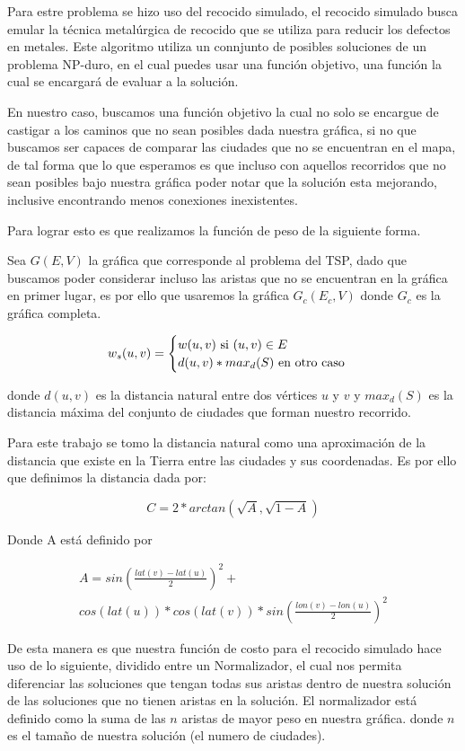 \begin{multicols}{2}
Para estre problema se hizo uso del recocido simulado, el recocido simulado busca emular la técnica metalúrgica de recocido que se utiliza para reducir los defectos en metales. Este algoritmo utiliza un connjunto de posibles soluciones de un problema NP-duro, en el cual puedes usar una función objetivo, una función la cual se encargará de evaluar a la solución.

En nuestro caso, buscamos una función objetivo la cual no solo se encargue de castigar a los caminos que no sean posibles dada nuestra gráfica, si no que buscamos ser capaces de comparar las ciudades que no se encuentran en el mapa, de tal forma que lo que esperamos es que incluso con aquellos recorridos que no sean posibles bajo nuestra gráfica poder notar que la solución esta mejorando, inclusive encontrando menos conexiones inexistentes.

Para lograr esto es que realizamos la función de peso de la siguiente forma.

Sea $G(E,V)$ la gráfica que corresponde al problema del TSP, dado que buscamos poder considerar incluso las aristas que no se encuentran en la gráfica en primer lugar, es por ello que usaremos la gráfica $G_c(E_c, V)$ donde $G_c$ es la gráfica completa.

\[
  w_s(u,v) =
  \begin{cases}
    w(u,v) $ si $ (u,v) \in E \\
    d(u,v) * max_d(S) $ en otro caso$
  \end{cases}
\]

donde $d(u,v)$ es la distancia natural entre dos vértices $u$ y $v$ y $max_d(S)$ es la distancia máxima del conjunto de ciudades que forman nuestro recorrido.

Para este trabajo se tomo la distancia natural como una aproximación de la distancia que existe en la Tierra entre las ciudades y sus coordenadas. Es por ello que definimos la distancia dada por:

\[
  C = 2 * arctan(\sqrt{A}, \sqrt{1-A})
\]

Donde A está definido por

\[
  \begin{aligned}
  A = sin(\frac{lat(v) - lat(u)}{2})^2 +  \\
  cos(lat(u)) * cos(lat(v)) * sin(\frac{lon(v) - lon(u)}{2})^2
  \end{aligned}
\]

De esta manera es que nuestra función de costo para el recocido simulado hace uso de lo siguiente, dividido entre un Normalizador, el cual nos permita diferenciar las soluciones que tengan todas sus aristas dentro de nuestra solución de las soluciones que no tienen aristas en la solución. El normalizador está definido como la suma de las $n$ aristas de mayor peso en nuestra gráfica. donde $n$ es el tamaño de nuestra solución (el numero de ciudades).


\end{multicols}
